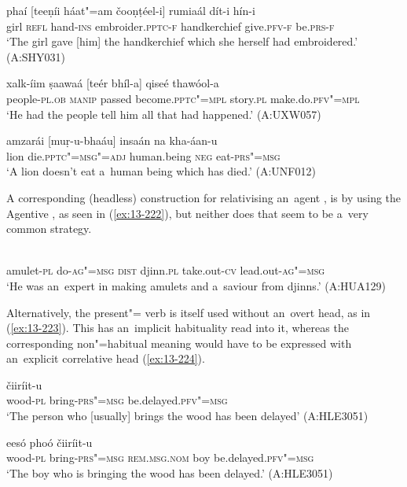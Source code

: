 \begin{exe}
\ex
\label{ex:13-219}
\gll phaí [teeṇíi háat"=am čooṇṭéel-i] rumiaál dít-i  hín-i \\
girl \textsc{refl} hand-\textsc{ins} embroider.\textsc{pptc-f} handkerchief give.\textsc{pfv-f} be.\textsc{prs-f} \\
\glt `The girl gave [him] the handkerchief which she herself had embroidered.' (A:SHY031)

\ex
\label{ex:13-220}
\gll xalk-íim ṣaawaá [teér bhíl-a] qiseé  thawóol-a \\
people-\textsc{pl.ob} \textsc{manip} passed become.\textsc{pptc"=mpl} story.\textsc{pl} make.do.\textsc{pfv"=mpl} \\
\glt `He had the people tell him all that had happened.' (A:UXW057)

\ex
\label{ex:13-221}
\gll amzarái [muṛ-u-bhaáu] insaán na  kha-áan-u \\
lion die.\textsc{pptc"=msg"=adj} human.being \textsc{neg} eat-\textsc{prs"=msg} \\
\glt `A lion doesn't eat a~human being which has died.' (A:UNF012) 
\end{exe}

A corresponding (headless) construction for relativising an~agent , is by using the Agentive , as seen in (\ref{ex:13-222}), but neither does that seem to be a~very common strategy. 

\begin{exe}
\ex
\label{ex:13-222}
 \\
amulet-\textsc{pl} do-\textsc{ag"=msg} \textsc{dist} djinn.\textsc{pl} take.out-\textsc{cv} lead.out-\textsc{ag"=msg} \\
\glt `He was an~expert in making amulets and a~saviour from djinns.' (A:HUA129) 
\end{exe}

Alternatively, the present"= verb is itself used without an~overt head, as in (\ref{ex:13-223}). This has an~implicit habituality read into it, whereas the corresponding non"=habitual meaning would have to be expressed with an~explicit correlative head (\ref{ex:13-224}).

\begin{exe}
\ex
\label{ex:13-223}
 čiiríit-u  \\
wood-\textsc{pl} bring-\textsc{prs"=msg} be.delayed.\textsc{pfv"=msg} \\
\glt `The person who [usually] brings the wood has been delayed' (A:HLE3051)

\ex
\label{ex:13-224}
 eesó phoó čiiríit-u  \\
wood-\textsc{pl} bring-\textsc{prs"=msg} \textsc{rem.ms}\textsc{g.}\textsc{nom} boy be.delayed.\textsc{pfv"=msg}  \\
\glt `The boy who is bringing the wood has been delayed.' (A:HLE3051)
\end{exe}

